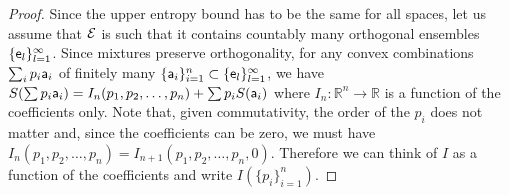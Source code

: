 \begin{proof}
	Since the upper entropy bound has to be the same for all spaces, let us assume that $\Ens$ is such that it contains countably many orthogonal ensembles $\{\ens_l\}_{l=1}^{\infty}$. Since mixtures preserve orthogonality, for any convex combinations $\sum_i p_i \ens[a]_i$ of finitely many $\{\ens[a]_i\}_{i=1}^{n} \subset \{\ens_l\}_{l=1}^{\infty}$,  we have $S(\sum p_i \ens[a]_i ) = I_n(p_1, p_2, \dots, p_n) + \sum p_i S(\ens[a]_i)$ where $I_n : \mathbb{R}^n \to \mathbb{R}$ is a function of the coefficients only. Note that, given commutativity, the order of the $p_i$ does not matter and, since the coefficients can be zero, we must have $I_n(p_1, p_2, \dots, p_n) = I_{n+1}(p_1, p_2, \dots, p_n, 0)$. Therefore we can think of $I$ as a function of the coefficients and write $I(\{p_i\}_{i=1}^{n})$.
	

\end{proof}
